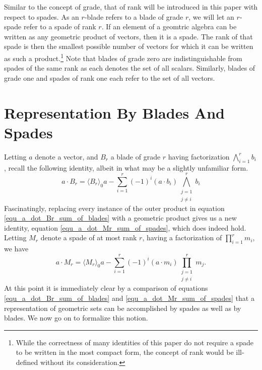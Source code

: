 \documentclass{birkjour}
\theoremstyle{definition}
\theoremstyle{remark}
\numberwithin{equation}{section}
\begin{document}
Similar to the concept of grade, that of rank will be introduced in this paper with respect to spades.  As an $r$-blade
refers to a blade of grade $r$, we will let an $r$-spade refer to a spade of rank $r$.  If an element of a geomtric
algebra can be written as any geometric product of vectors, then it is a spade.  The rank of that spade is then the smallest
possible number of vectors for which it can be written as such a product.\footnote{While the correctness of many identities of this paper
do not require a spade to be written in the most compact form, the concept of rank would be ill-defined without its consideration.}   Note that blades of grade zero
are indistinguishable from spades of the same rank as each denotes the set of all scalars.  Similarly, blades of grade one and spades of rank one
each refer to the set of all vectors.

\section{Representation By Blades And Spades}

Letting $a$ denote a vector, and $B_r$ a blade of grade $r$ having factorization $\bigwedge_{i=1}^r b_i$, recall
the following identity, albeit in what may be a slightly unfamiliar form.
\begin{equation}\label{equ_a_dot_Br_sum_of_blades}
a\cdot B_r = \langle B_r\rangle_0a - \sum_{i=1}^r(-1)^i(a\cdot b_i)\bigwedge_{\substack{j=1\\j\neq i}}^rb_i
\end{equation}
Fascinatingly, replacing every instance of the outer product in equation \eqref{equ_a_dot_Br_sum_of_blades} with
a geometric product gives us a new identity, equation \eqref{equ_a_dot_Mr_sum_of_spades}, which does indeed hold.  Letting $M_r$ denote
a spade of at most rank $r$, having a factorization of $\prod_{i=1}^r m_i$, we have
\begin{equation}\label{equ_a_dot_Mr_sum_of_spades}
a\cdot M_r = \langle M_r\rangle_0a - \sum_{i=1}^r(-1)^i(a\cdot m_i)\prod_{\substack{j=1\\j\neq i}}^rm_j.
\end{equation}
At this point it is immediately clear by a comparison of equations \eqref{equ_a_dot_Br_sum_of_blades} and \eqref{equ_a_dot_Mr_sum_of_spades}
that a representation of geometric sets can be accomplished by spades as well as by blades.  We now go on to formalize this notion.
\end{document}
